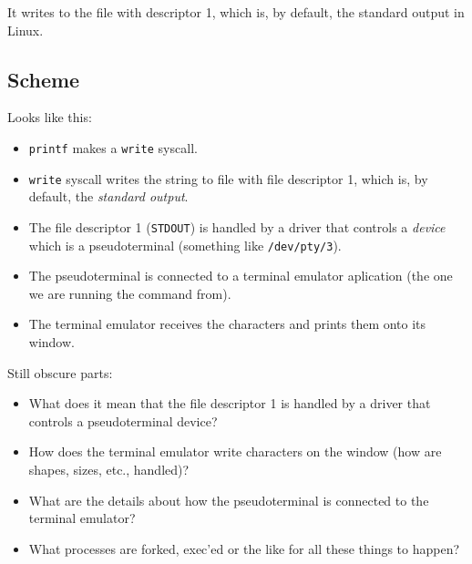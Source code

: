 \documentclass[11pt]{article}
\begin{document}
It writes to the file with descriptor 1, which is, by default, the standard output in Linux.
\subsection{Scheme}
\label{sec:org51dbd2b}

Looks like this:
\begin{itemize}
\item \texttt{printf} makes a \texttt{write} syscall.
\item \texttt{write} syscall writes the string to file with file descriptor 1, which is, by default, the \emph{standard output}.
\item The file descriptor 1 (\texttt{STDOUT}) is handled by a driver that controls a \emph{device} which is a pseudoterminal (something like \texttt{/dev/pty/3}).
\item The pseudoterminal is connected to a terminal emulator aplication (the one we are running the command from).
\item The terminal emulator receives the characters and prints them onto its window.
\end{itemize}

Still obscure parts:
\begin{itemize}
\item What does it mean that the file descriptor 1 is handled by a driver that controls a pseudoterminal device?
\item How does the terminal emulator write characters on the window (how are shapes, sizes, etc., handled)?
\item What are the details about how the pseudoterminal is connected to the terminal emulator?
\item What processes are forked, exec'ed or the like for all these things to happen?
\end{itemize}
\end{document}
